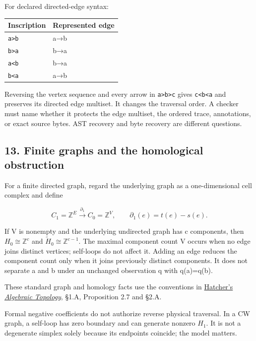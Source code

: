 \documentclass[
  11pt,
]{article}
\begin{document}
For declared directed-edge syntax:

\begin{longtable}[]{@{}ll@{}}
\toprule\noalign{}
Inscription & Represented edge \\
\midrule\noalign{}
\endhead
\bottomrule\noalign{}
\endlastfoot
\texttt{a\textgreater{}b} & a→b \\
\texttt{b\textgreater{}a} & b→a \\
\texttt{a\textless{}b} & b→a \\
\texttt{b\textless{}a} & a→b \\
\end{longtable}

Reversing the vertex sequence and every arrow in
\texttt{a\textgreater{}b\textgreater{}c} gives
\texttt{c\textless{}b\textless{}a} and preserves its directed edge
multiset. It changes the traversal order. A checker must name whether it
protects the edge multiset, the ordered trace, annotations, or exact
source bytes. AST recovery and byte recovery are different questions.

\subsection{13. Finite graphs and the homological
obstruction}\label{finite-graphs-and-the-homological-obstruction}

For a finite directed graph, regard the underlying graph as a
one-dimensional cell complex and define

\[
C_1=\mathbb Z^E\xrightarrow{\partial_1}C_0=\mathbb Z^V,
\qquad\partial_1(e)=t(e)-s(e).
\]

If V is nonempty and the underlying undirected graph has c components,
then \(H_0\cong\mathbb Z^c\) and \(\widetilde H_0\cong\mathbb Z^{c-1}\).
The maximal component count \textbar V\textbar{} occurs when no edge
joins distinct vertices; self-loops do not affect it. Adding an edge
reduces the component count only when it joins previously distinct
components. It does not separate a and b under an unchanged observation
q with q(a)=q(b).

These standard graph and homology facts use the conventions in
\href{https://pi.math.cornell.edu/~hatcher/AT/AT.pdf}{Hatcher's
\emph{Algebraic Topology}}, §1.A, Proposition 2.7 and §2.A.

Formal negative coefficients do not authorize reverse physical
traversal. In a CW graph, a self-loop has zero boundary and can generate
nonzero \(H_1\). It is not a degenerate simplex solely because its
endpoints coincide; the model matters.
\end{document}
